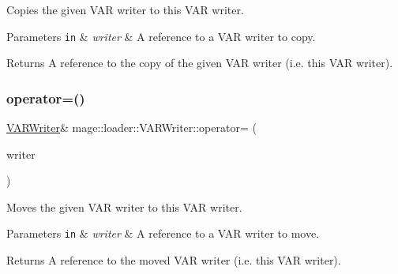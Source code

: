 Copies the given V\+AR writer to this V\+AR writer.


\begin{DoxyParams}[1]{Parameters}
\mbox{\tt in}  & {\em writer} & A reference to a V\+AR writer to copy. \\
\hline
\end{DoxyParams}
\begin{DoxyReturn}{Returns}
A reference to the copy of the given V\+AR writer (i.\+e. this V\+AR writer). 
\end{DoxyReturn}
\mbox{\label{classmage_1_1loader_1_1_v_a_r_writer_aef0efc3b6d9ca8c0da5e45063da01365}} 
\subsubsection{\texorpdfstring{operator=()}{operator=()}\hspace{0.1cm}{\footnotesize\ttfamily [2/2]}}
{\footnotesize\ttfamily \mbox{\hyperlink{classmage_1_1loader_1_1_v_a_r_writer}{V\+A\+R\+Writer}}\& mage\+::loader\+::\+V\+A\+R\+Writer\+::operator= (\begin{DoxyParamCaption}\item[{\mbox{\hyperlink{classmage_1_1loader_1_1_v_a_r_writer}{V\+A\+R\+Writer}} \&\&}]{writer }\end{DoxyParamCaption})\hspace{0.3cm}{\ttfamily [delete]}}

Moves the given V\+AR writer to this V\+AR writer.


\begin{DoxyParams}[1]{Parameters}
\mbox{\tt in}  & {\em writer} & A reference to a V\+AR writer to move. \\
\hline
\end{DoxyParams}
\begin{DoxyReturn}{Returns}
A reference to the moved V\+AR writer (i.\+e. this V\+AR writer). 
\end{DoxyReturn}
\mbox{\label{classmage_1_1loader_1_1_v_a_r_writer_af2bbf94353f1b4b01aa56e8dd9c89d7f}} 

